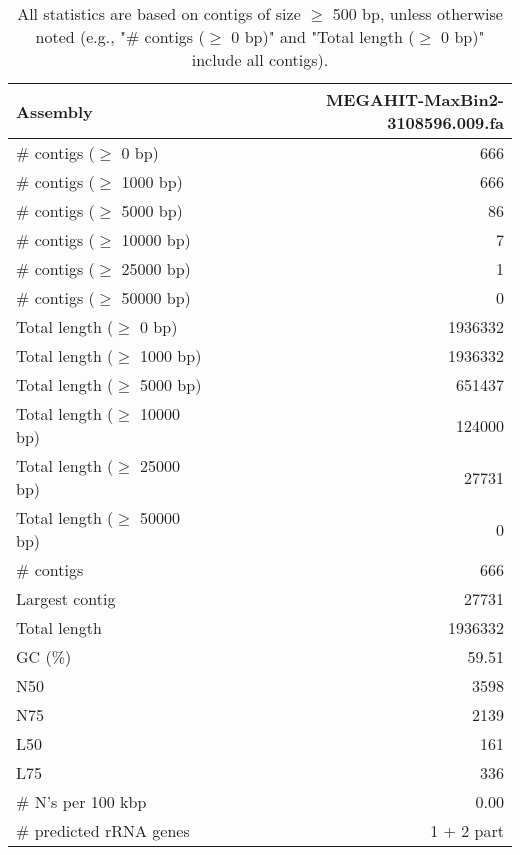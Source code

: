 \documentclass[12pt,a4paper]{article}
\begin{document}
\begin{table}[ht]
\begin{center}
\caption{All statistics are based on contigs of size $\geq$ 500 bp, unless otherwise noted (e.g., "\# contigs ($\geq$ 0 bp)" and "Total length ($\geq$ 0 bp)" include all contigs).}
\begin{tabular}{|l*{1}{|r}|}
\hline
Assembly & MEGAHIT-MaxBin2-3108596.009.fa \\ \hline
\# contigs ($\geq$ 0 bp) & 666 \\ \hline
\# contigs ($\geq$ 1000 bp) & 666 \\ \hline
\# contigs ($\geq$ 5000 bp) & 86 \\ \hline
\# contigs ($\geq$ 10000 bp) & 7 \\ \hline
\# contigs ($\geq$ 25000 bp) & 1 \\ \hline
\# contigs ($\geq$ 50000 bp) & 0 \\ \hline
Total length ($\geq$ 0 bp) & 1936332 \\ \hline
Total length ($\geq$ 1000 bp) & 1936332 \\ \hline
Total length ($\geq$ 5000 bp) & 651437 \\ \hline
Total length ($\geq$ 10000 bp) & 124000 \\ \hline
Total length ($\geq$ 25000 bp) & 27731 \\ \hline
Total length ($\geq$ 50000 bp) & 0 \\ \hline
\# contigs & 666 \\ \hline
Largest contig & 27731 \\ \hline
Total length & 1936332 \\ \hline
GC (\%) & 59.51 \\ \hline
N50 & 3598 \\ \hline
N75 & 2139 \\ \hline
L50 & 161 \\ \hline
L75 & 336 \\ \hline
\# N's per 100 kbp & 0.00 \\ \hline
\# predicted rRNA genes & 1 + 2 part \\ \hline
\end{tabular}
\end{center}
\end{table}
\end{document}

